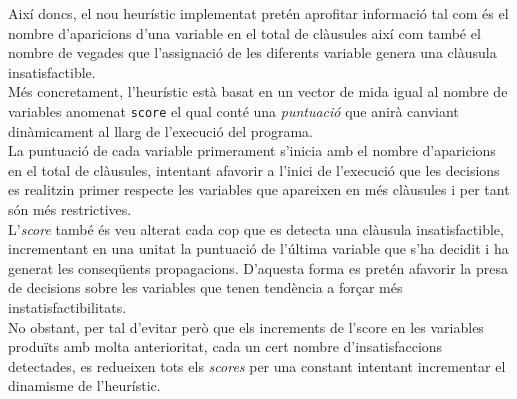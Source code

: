  Així doncs, el nou heurístic implementat pretén aprofitar informació tal com és el nombre d'aparicions d'una variable en el total de clàusules així com també el nombre de vegades que l'assignació de les diferents variable genera una clàusula insatisfactible.\\
 Més concretament, l'heurístic està basat en un vector de mida igual al nombre de variables anomenat \texttt{score} el qual conté una \textit{puntuació} que anirà canviant dinàmicament al llarg de l'execució del programa.\\
 
  La puntuació de cada variable primerament s'inicia amb el nombre d'aparicions en el total de clàusules, intentant afavorir a l'inici de l'execució que les decisions es realitzin primer respecte les variables que apareixen en més clàusules i per tant són més restrictives.\\
 L'\textit{score} també és veu alterat cada cop que es detecta una clàusula insatisfactible, incrementant en una unitat la puntuació de l'última variable que s'ha decidit i ha generat les conseqüents propagacions. D'aquesta forma es pretén afavorir la presa de decisions sobre les variables que tenen tendència a forçar més instatisfactibilitats.\\
 
  No obstant, per tal d'evitar però que els increments de l'score en les variables produïts amb molta anterioritat, cada un cert nombre d'insatisfaccions detectades, es redueixen tots els \textit{scores} per una constant intentant incrementar el dinamisme de l'heurístic.\\



